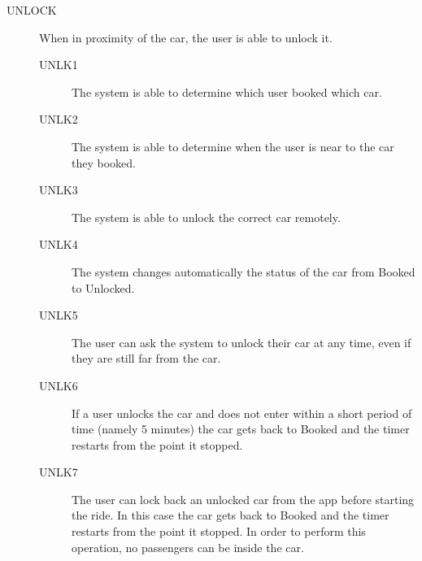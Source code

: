 \documentclass[11pt]{article} %
\begin{document}
\begin{description}
 	\item[UNLOCK] When in proximity of the car, the user is able to unlock it.
	\begin{description}
	\item[UNLK1] The system is able to determine which user booked which car.
	\item[UNLK2] The system is able to determine when the user is near to the car they booked.
	\item[UNLK3] The system is able to unlock the correct car remotely.
	\item[UNLK4] The system changes automatically the status of the car from Booked to Unlocked.
	\item[UNLK5] The user can ask the system to unlock their car at any time, even if they are still far from the car.
	\item[UNLK6] If a user unlocks the car and does not enter within a short period of time (namely 5 minutes) the car gets back to Booked and the timer restarts from the point it stopped.
	\item[UNLK7] The user can lock back an unlocked car from the app before starting the ride. In this case the car gets back to Booked and the timer restarts from the point it stopped. In order to perform this operation, no passengers can be inside the car.
	\end{description}


\end{description}
\end{document}
